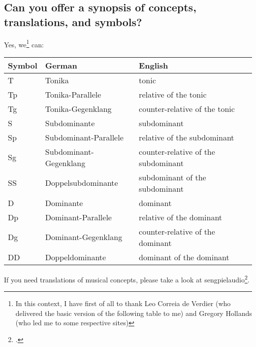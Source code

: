 \documentclass[
  DIV=calc,
  BCOR=5mm,
  12pt,
  headings=small,
  oneside,
  abstract=true,
  toc=bib,
  xcolor=dvipsnames,
  openany,
  english]{scrartcl}
\begin{document}
\subsection{Can you offer a synopsis of concepts, translations, and symbols?}

Yes, we\footnote{In this context, I have first of all to thank Leo Correia de
Verdier (who delivered the basic version of the following table to me) and
Gregory Hollands (who led me to some respective sites)} can:

\begin{tabular}{|l|l|l|}
\hline
Symbol & German & English \tabularnewline
\hline
\hline
T      & Tonika                 & tonic \\
\hline
Tp     & Tonika-Parallele       & relative of the tonic \\
\hline
Tg     & Tonika-Gegenklang      & counter-relative of the tonic \\
\hline
S      & Subdominante           & subdominant \\
\hline
Sp     & Subdominant-Parallele  & relative of the subdominant \\
\hline
Sg     & Subdominant-Gegenklang & counter-relative of the subdominant \\
\hline
SS     & Doppelsubdominante     & subdominant of the subdominant \\
\hline
D      & Dominante              & dominant \\
\hline
Dp     & Dominant-Parallele     & relative of the dominant \\
\hline
Dg     & Dominant-Gegenklang    & counter-relative of the dominant \\
\hline
DD     & Doppeldominante        & dominant of the dominant \\
\hline
\hline

\end{tabular}

If you need translations of musical concepts, please take a look at
sengpielaudio\footcite[cf.][\nopage wp]{sengpielaudio2019a}.















%
\printnomenclature


\end{document}
